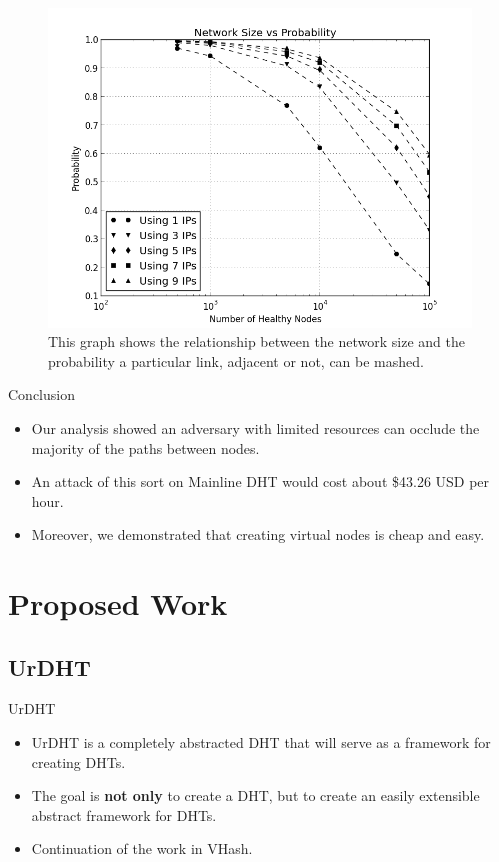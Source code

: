 \documentclass[11pt]{beamer}
\begin{document}
\begin{frame}
    \begin{figure}
        \centering
        \includegraphics[width=0.7\linewidth]{figs/size_occlusion_chord}
        \caption{This graph shows the relationship between the network size and the probability a particular link, adjacent or not, can be mashed.}
        \label{fig:exp3}
    \end{figure}
\end{frame}
    
\begin{frame}{Conclusion}
	\begin{itemize}
		
		\item Our analysis showed an adversary with limited resources can occlude the majority of the paths between nodes.
		\item An attack of this sort on Mainline DHT would cost about \$43.26 USD per hour.
		\item Moreover, we demonstrated that creating virtual nodes is cheap and easy.
	\end{itemize}
\end{frame}


\section{Proposed Work}



\subsection{UrDHT}
\begin{frame}{UrDHT}
	\begin{itemize}
		\item UrDHT is a completely abstracted DHT that will serve as a framework for creating DHTs.
		\item The goal is \textbf{not only} to create a DHT, but to create an easily extensible abstract framework for DHTs.
		\item Continuation of the work in VHash.
	\end{itemize}
\end{frame}
\end{document}
